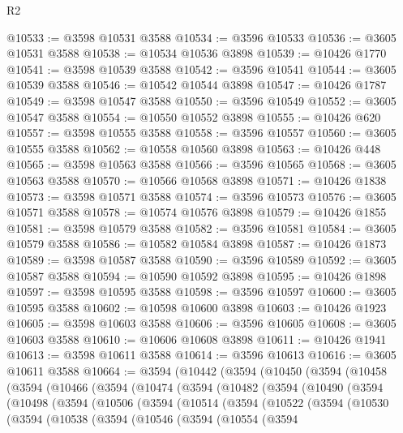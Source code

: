 \begin{lexlean}{R2}
\begin{coremodule}
@10533 := @3598 @10531 @3588
@10534 := @3596 @10533
@10536 := @3605 @10531 @3588
@10538 := @10534 @10536 @3898
@10539 := @10426 @1770
@10541 := @3598 @10539 @3588
@10542 := @3596 @10541
@10544 := @3605 @10539 @3588
@10546 := @10542 @10544 @3898
@10547 := @10426 @1787
@10549 := @3598 @10547 @3588
@10550 := @3596 @10549
@10552 := @3605 @10547 @3588
@10554 := @10550 @10552 @3898
@10555 := @10426 @620
@10557 := @3598 @10555 @3588
@10558 := @3596 @10557
@10560 := @3605 @10555 @3588
@10562 := @10558 @10560 @3898
@10563 := @10426 @448
@10565 := @3598 @10563 @3588
@10566 := @3596 @10565
@10568 := @3605 @10563 @3588
@10570 := @10566 @10568 @3898
@10571 := @10426 @1838
@10573 := @3598 @10571 @3588
@10574 := @3596 @10573
@10576 := @3605 @10571 @3588
@10578 := @10574 @10576 @3898
@10579 := @10426 @1855
@10581 := @3598 @10579 @3588
@10582 := @3596 @10581
@10584 := @3605 @10579 @3588
@10586 := @10582 @10584 @3898
@10587 := @10426 @1873
@10589 := @3598 @10587 @3588
@10590 := @3596 @10589
@10592 := @3605 @10587 @3588
@10594 := @10590 @10592 @3898
@10595 := @10426 @1898
@10597 := @3598 @10595 @3588
@10598 := @3596 @10597
@10600 := @3605 @10595 @3588
@10602 := @10598 @10600 @3898
@10603 := @10426 @1923
@10605 := @3598 @10603 @3588
@10606 := @3596 @10605
@10608 := @3605 @10603 @3588
@10610 := @10606 @10608 @3898
@10611 := @10426 @1941
@10613 := @3598 @10611 @3588
@10614 := @3596 @10613
@10616 := @3605 @10611 @3588
@10664 := @3594
    (@10442
      (@3594
        (@10450
          (@3594
            (@10458
              (@3594
                (@10466
                  (@3594
                    (@10474
                      (@3594
                        (@10482
                          (@3594
                            (@10490
                              (@3594
                                (@10498
                                  (@3594
                                    (@10506
                                      (@3594
                                        (@10514
                                          (@3594
                                            (@10522
                                              (@3594
                                                (@10530
                                                  (@3594
                                                    (@10538
                                                      (@3594
                                                        (@10546
                                                          (@3594
                                                            (@10554
                                                              (@3594

\end{coremodule}
\end{lexlean}
